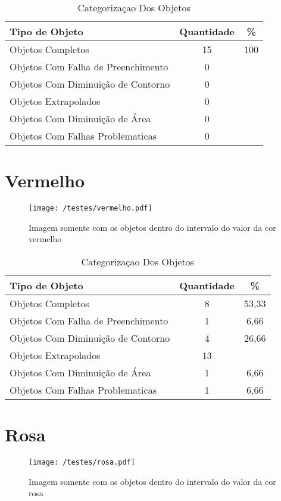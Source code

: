 \begin{table}[h]
\centering
\begin{tabular}{l|c|c}
Tipo de Objeto & Quantidade & \% \\ %
\hline                               %
Objetos Completos &  15 &100 \\
\hline 
Objetos Com Falha de Preenchimento & 0\\
\hline 
Objetos Com Diminuição de Contorno &  0\\
\hline 
Objetos Extrapolados & 0 \\
\hline 
Objetos Com Diminuição de Área &  0 \\
\hline 
Objetos Com Falhas Problematicas & 0 \\
\hline 
\end{tabular}
\caption{Categorizaçao Dos Objetos}
\end{table}	
	
\section{Vermelho}
	\begin{figure}[H]
		\centering
		\texttt{[image: /testes/vermelho.pdf]}
		\caption{Imagem somente com os objetos dentro do intervalo do valor da cor vermelho}
		\label{disposicaoparte}
	\end{figure}
	
	\begin{table}[h]
\centering
\begin{tabular}{l|c|c}
Tipo de Objeto & Quantidade  & \% \\ %
\hline                               %
Objetos Completos &  8 & 53,33 \\
\hline 
Objetos Com Falha de Preenchimento & 1 & 6,66 \\
\hline 
Objetos Com Diminuição de Contorno &  4 & 26,66 \\
\hline 
Objetos Extrapolados &  13 \\
\hline 
Objetos Com Diminuição de Área &  1 &6,66 \\
\hline 
Objetos Com Falhas Problematicas &  1 & 6,66\\
\hline 
\end{tabular}
\caption{Categorizaçao Dos Objetos}
\end{table}

\section{Rosa}
	\begin{figure}[H]
		\centering
		\texttt{[image: /testes/rosa.pdf]}
		\caption{Imagem somente com os objetos dentro do intervalo do valor da cor rosa}
		\label{disposicaoparte}
	\end{figure}
	
